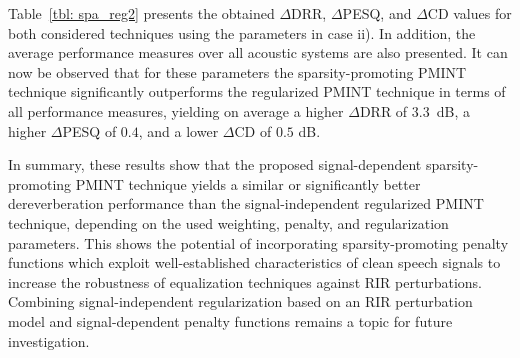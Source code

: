 \documentclass[10pt]{IEEEtran}
\begin{document}
Table~\ref{tbl: spa_reg2} presents the obtained $\Delta$DRR, $\Delta$PESQ, and $\Delta$CD values for both considered techniques using the parameters in case ii).
In addition, the average performance measures over all acoustic systems are also presented.
It can now be observed that for these parameters the sparsity-promoting PMINT technique significantly outperforms the regularized PMINT technique in terms of all performance measures, yielding on average a higher $\Delta$DRR of $3.3$~dB, a higher $\Delta$PESQ of $0.4$, and a lower $\Delta$CD of $0.5$ dB.

In summary, these results show that the proposed signal-dependent sparsity-promoting PMINT technique yields a similar or significantly better dereverberation performance than the signal-independent regularized PMINT technique, depending on the used weighting, penalty, and regularization parameters.
This shows the potential of incorporating sparsity-promoting penalty functions which exploit well-established characteristics of clean speech signals to increase the robustness of equalization techniques against RIR perturbations.
Combining signal-independent regularization based on an RIR perturbation model and signal-dependent penalty functions remains a topic for future investigation.
\end{document}
